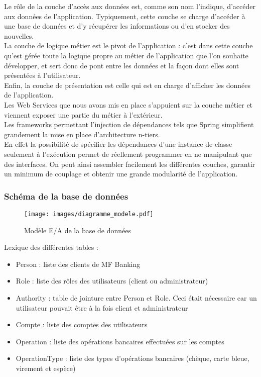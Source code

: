 Le rôle de la couche d'accès aux données est, comme son nom l'indique, d'accéder aux données de l'application. Typiquement, cette couche se charge d'accéder à une base de données et d'y récupérer les informations ou d'en stocker des nouvelles.\\
 
La couche de logique métier est le pivot de l'application : c'est dans cette couche qu'est gérée toute la logique propre au métier de l'application que l'on souhaite développer, et sert donc de pont entre les données et la façon dont elles sont présentées à l'utilisateur.\\

Enfin, la couche de présentation est celle qui est en charge d'afficher les données de l'application.\\
 
Les Web Services que nous avons mis en place s'appuient sur la couche métier et viennent exposer une partie du métier à l'extérieur.\\
 
Les frameworks permettant l'injection de dépendances tels que Spring simplifient grandement la mise en place d'architecture n-tiers.\\
En effet la possibilité de spécifier les dépendances d'une instance de classe seulement à l'exécution permet de réellement programmer en ne manipulant que des interfaces. On peut ainsi assembler facilement les différentes couches, garantir un minimum de couplage et obtenir une grande modularité de l'application. 
 
\subsubsection{Schéma de la base de données}
	\begin{figure}[h!]
		\centering
			\texttt{[image: images/diagramme\_modele.pdf]} 
		\caption{Modèle E/A de la base de données}
	\end{figure}

Lexique des différentes tables :
\begin{itemize}
	\item Person : liste des clients de MF Banking
	\item Role : liste des rôles des utilisateurs (client ou administrateur)
	\item Authority : table de jointure entre Person et Role. Ceci était nécessaire car un utilisateur pouvait être à la fois client et administrateur  
	\item Compte : liste des comptes des utilisateurs
	\item Operation : liste des opérations bancaires effectuées sur les comptes
	\item OperationType : liste des types d'opérations bancaires (chèque, carte bleue, virement et espèce)
\end{itemize}

